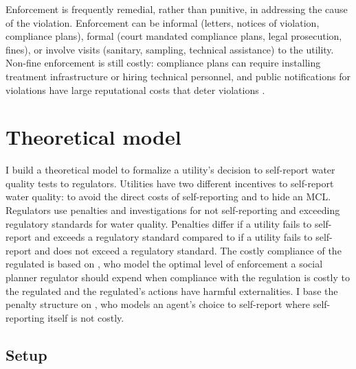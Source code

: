 \documentclass{article}
\begin{document}
Enforcement is frequently remedial, rather than punitive, in addressing the cause of the violation. Enforcement can be informal (letters, notices of violation, compliance plans), formal (court mandated compliance plans, legal prosecution, fines), or involve visits (sanitary, sampling, technical assistance) to the utility. Non-fine enforcement is still costly: compliance plans can require installing treatment infrastructure or hiring technical personnel, and public notifications for violations have large reputational costs that deter violations \parencite{bennear2008impacts}.

\section{Theoretical model}

I build a theoretical model to formalize a utility's decision to self-report water quality tests to regulators. Utilities have two different incentives to self-report water quality: to avoid the direct costs of self-reporting and to hide an MCL. Regulators use penalties and investigations for not self-reporting and exceeding regulatory standards for water quality. Penalties differ if a utility fails to self-report and exceeds a regulatory standard compared to if a utility fails to self-report and does not exceed a regulatory standard. The costly compliance of the regulated is based on \textcite{mookherjee1994marginal}, who model the optimal level of enforcement a social planner regulator should expend when compliance with the regulation is costly to the regulated and the regulated's actions have harmful externalities. I base the penalty structure on \textcite{kaplow1994optimal}, who models an agent's choice to self-report where self-reporting itself is not costly. 

\subsection{Setup}
\end{document}
